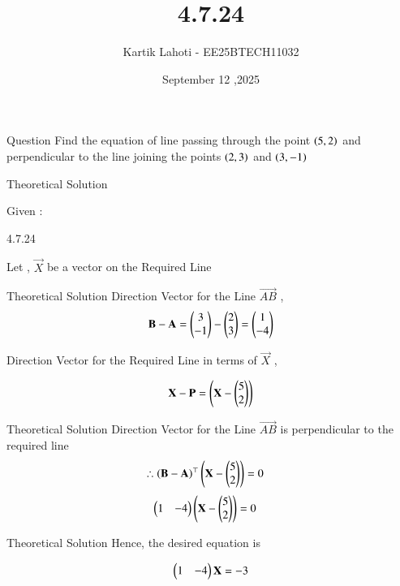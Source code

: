 \documentclass{beamer}
\title %
{4.7.24}
\date{September 12 ,2025}
\author 
{Kartik Lahoti - EE25BTECH11032}
\begin{document}
\frame{\titlepage}
\begin{frame}{Question}
Find the equation of line passing through the point $\left(5,2\right)$ and perpendicular to the line joining the points $\left(2,3\right)$ and $\left(3,-1\right)$
\end{frame}

\begin{frame}{Theoretical Solution}

Given : 
\begin{table}[H]
    \centering
    
    \caption{4.7.24}
    \label{tab:placeholder_1}
\end{table}

Let , $\vec{X}$ be a vector on the Required Line

\end{frame}
\begin{frame}{Theoretical Solution}
Direction Vector for the Line $\vec{AB}$ , 
\begin{align}
    \mathbf{B} - \mathbf{A} = \begin{pmatrix}3 \\ -1\end{pmatrix} - \begin{pmatrix}2 \\ 3\end{pmatrix} = \begin{pmatrix}1 \\ -4\end{pmatrix}
\end{align}

Direction Vector for the Required Line in terms of $\vec{X}$ , 

\begin{align}
    \mathbf{X} - \mathbf{P} = \left(\mathbf{X} - \begin{pmatrix}5 \\ 2\end{pmatrix}\right)
\end{align}

\end{frame}
\begin{frame}{Theoretical Solution}
Direction Vector for the Line $\vec{AB}$ is perpendicular to the required line
\begin{align}
        \therefore \left(\mathbf{B} - \mathbf{A}\right)^{\top}\left(\mathbf{X} - \begin{pmatrix}5 \\ 2\end{pmatrix}\right) &= 0
\end{align}
\begin{align}
    \begin{pmatrix}1 & -4\end{pmatrix}\left(\mathbf{X} - \begin{pmatrix}5 \\ 2\end{pmatrix}\right) &= 0
\end{align}
\end{frame}

\begin{frame}{Theoretical Solution}
Hence, the desired equation is 

\begin{align}
    \begin{pmatrix}1 & -4\end{pmatrix}\mathbf{X} = -3
\end{align}
\end{frame}
\end{document}
